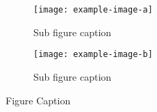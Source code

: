 \begin{figure}
    \centering
    \begin{subfigure}[b]{0.49\textwidth}
        \centering
        \texttt{[image: example-image-a]}
        \caption{Sub figure caption}
    \end{subfigure}
    \hfill
    \begin{subfigure}[b]{0.49\textwidth}
        \centering
        \texttt{[image: example-image-b]}
        \caption{Sub figure caption}
    \end{subfigure}
    \caption{Figure Caption}
\end{figure}